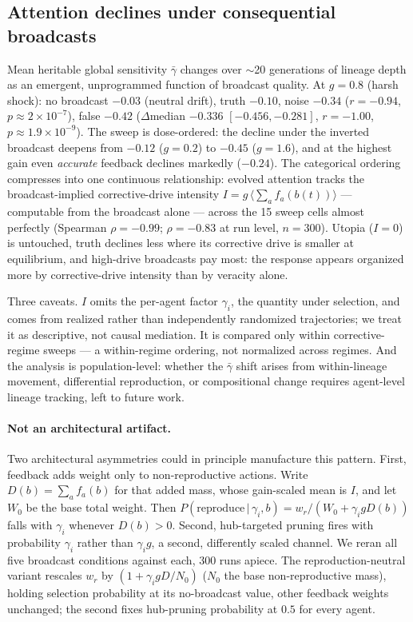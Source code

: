\documentclass{svproc}
\begin{document}
\subsection{Attention declines under consequential broadcasts}
Mean heritable global sensitivity $\bar\gamma$ changes over $\sim$20
generations of lineage depth as an emergent, unprogrammed function of
broadcast quality. At $g=0.8$ (harsh shock): no
broadcast $-0.03$ (neutral drift), truth $-0.10$, noise $-0.34$ ($r=-0.94$,
$p\!\approx\!2\times10^{-7}$), false $-0.42$ ($\Delta$median $-0.336$
$[-0.456,-0.281]$, $r=-1.00$, $p\!\approx\!1.9\times10^{-9}$). The sweep is
dose-ordered: the decline under the inverted broadcast deepens from $-0.12$
($g=0.2$) to $-0.45$ ($g=1.6$), and at the highest gain even \emph{accurate}
feedback declines markedly ($-0.24$). The categorical ordering compresses into one
continuous relationship: evolved attention tracks the broadcast-implied
corrective-drive intensity $I = g\,\langle\textstyle\sum_a f_a(b(t))\rangle$
--- computable from the broadcast alone --- across the 15 sweep cells almost
perfectly (Spearman $\rho=-0.99$; $\rho=-0.83$ at run level, $n=300$). Utopia ($I=0$) is untouched, truth declines less where its corrective drive is
smaller at equilibrium, and high-drive broadcasts pay most: the response appears organized more by
corrective-drive intensity than by veracity alone.

Three caveats. $I$ omits the per-agent factor $\gamma_i$, the quantity under
selection, and comes from realized rather than independently randomized
trajectories; we treat it as descriptive, not causal mediation. It is
compared only within corrective-regime sweeps --- a within-regime ordering,
not normalized across regimes. And the analysis is
population-level: whether the $\bar\gamma$ shift arises from within-lineage
movement, differential reproduction, or compositional change requires
agent-level lineage tracking, left to future work.

\paragraph{Not an architectural artifact.} Two architectural asymmetries
could in principle manufacture this pattern. First, feedback
adds weight only to non-reproductive actions. Write $D(b)=\sum_a f_a(b)$ for
that added mass, whose gain-scaled mean is $I$, and let $W_0$ be the base
total weight. Then
$P(\text{reproduce}\,|\,\gamma_i,b)=w_r/(W_0+\gamma_i g D(b))$ falls with
$\gamma_i$ whenever $D(b)>0$.
Second, hub-targeted pruning fires with probability $\gamma_i$ rather than
$\gamma_i g$, a second, differently scaled channel. We reran all five
broadcast conditions against each, 300 runs apiece. The reproduction-neutral
variant rescales $w_r$ by $(1+\gamma_i g D/N_0)$ ($N_0$ the base
non-reproductive mass), holding selection probability at its no-broadcast
value, other feedback weights unchanged; the second fixes hub-pruning
probability at $0.5$ for every agent.
\end{document}
